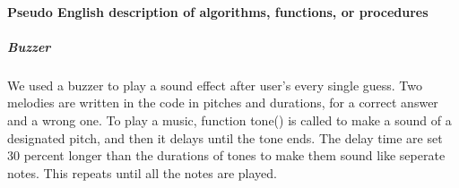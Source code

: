 \paragraph{Pseudo English description of algorithms, functions, or procedures}

\subparagraph{Buzzer}
\hfill \newline
We used a buzzer to play a sound effect after user's every single guess. Two melodies are written in the code in pitches and durations, for a correct answer and a wrong one. To play a music, function tone() is called to make a sound of a designated pitch, and then it delays until the tone ends. The delay time are set 30 percent longer than the durations of tones to make them sound like seperate notes. This repeats until all the notes are played.

